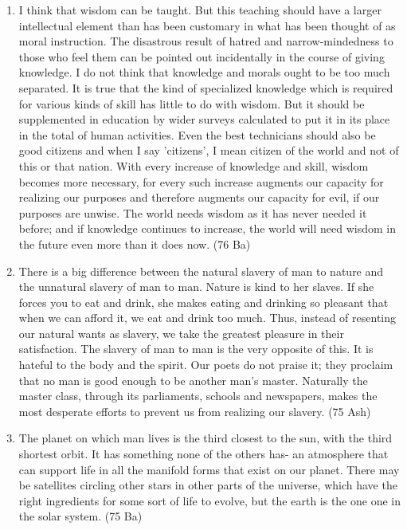 \documentclass[12pt]{article}
\begin{document}
\begin{enumerate}
    \item I think that wisdom can be taught. But this teaching should have a larger intellectual element than has been customary in what has been thought of as moral instruction. The disastrous result of hatred and narrow-mindedness to those who feel them can be pointed out incidentally in the course of giving knowledge. I do not think that knowledge and morals ought to be too much separated. It is true that the kind of specialized knowledge which is required for various kinds of skill has little to do with wisdom. But it should be supplemented in education by wider surveys calculated to put it in its place in the total of human activities. Even the best technicians should also be good citizens and when I say 'citizens', I mean citizen of the world and not of this or that nation. With every increase of knowledge and skill, wisdom becomes more necessary, for every such increase augments our capacity for realizing our purposes and therefore augments our capacity for evil, if our purposes are unwise. The world needs wisdom as it has never needed it before; and if knowledge continues to increase, the world will need wisdom in the future even more than it does now. \hfill (76 Ba)

    \item There is a big difference between the natural slavery of man to nature and the unnatural slavery of man to man. Nature is kind to her slaves. If she forces you to eat and drink, she makes eating and drinking so pleasant that when we can afford it, we eat and drink too much. Thus, instead of resenting our natural wants as slavery, we take the greatest pleasure in their satisfaction. The slavery of man to man is the very opposite of this. It is hateful to the body and the spirit. Our poets do not praise it; they proclaim that no man is good enough to be another man's master. Naturally the master class, through its parliaments, schools and newspapers, makes the most desperate efforts to prevent us from realizing our slavery. \hfill (75 Ash)

    \item The planet on which man lives is the third closest to the sun, with the third shortest orbit. It has something none of the others has- an atmosphere that can support life in all the manifold forms that exist on our planet. There may be satellites circling other stars in other parts of the universe, which have the right ingredients for some sort of life to evolve, but the earth is the one one in the solar system. \hfill (75 Ba)


\end{enumerate}
\end{document}
